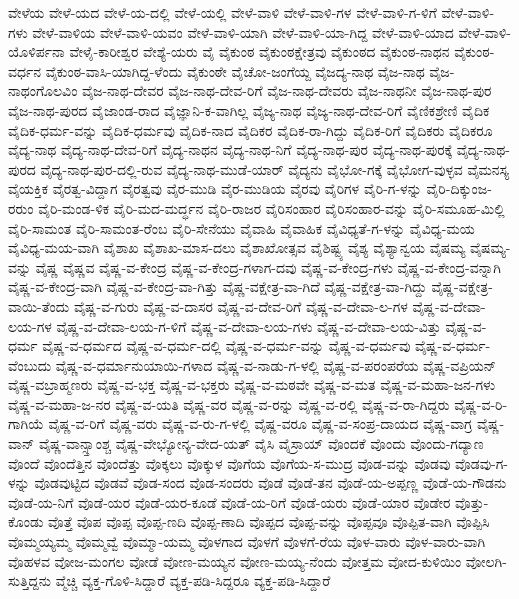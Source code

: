 ವೇಳೆಯ
ವೇಳೆ-ಯದ
ವೇಳೆ-ಯ-ದಲ್ಲಿ
ವೇಳೆ-ಯಲ್ಲಿ
ವೇಳೆ-ವಾಳಿ
ವೇಳೆ-ವಾಳಿ-ಗಳ
ವೇಳೆ-ವಾಳಿ-ಗ-ಳಿಗೆ
ವೇಳೆ-ವಾಳಿ-ಗಳು
ವೇಳೆ-ವಾಳಿಯ
ವೇಳೆ-ವಾಳಿ-ಯವಂ
ವೇಳೆ-ವಾಳಿ-ಯಾಗಿ
ವೇಳೆ-ವಾಳಿ-ಯಾ-ಗಿದ್ದ
ವೇಳೆ-ವಾಳಿ-ಯಾದ
ವೇಳೆ-ವಾಳಿ-ಯೊಳಿರ್ಪನಾ
ವೇಳೈ-ಕಾರೀಶ್ವರ
ವೇಶ್ಯೆ-ಯರು
ವೈ
ವೈಕುಂಠ
ವೈಕುಂಠಕ್ಷೇತ್ರವು
ವೈಕುಂಠದ
ವೈಕುಂಠ-ನಾಥನ
ವೈಕುಂಠ-ವರ್ಧನ
ವೈಕುಂಠ-ವಾಸಿ-ಯಾಗಿದ್ದ-ಳೆಂದು
ವೈಕುಂಠೇ
ವೈಚೋ-ಜಂಗೆಯ್ದ
ವೈಜದ್ಯ-ನಾಥ
ವೈಜ-ನಾಥ
ವೈಜ-ನಾಥಂಗೊಲವಿಂ
ವೈಜ-ನಾಥ-ದೇವರ
ವೈಜ-ನಾಥ-ದೇವ-ರಿಗೆ
ವೈಜ-ನಾಥ-ದೇವರು
ವೈಜ-ನಾಥನೀ
ವೈಜ-ನಾಥ-ಪುರ
ವೈಜ-ನಾಥ-ಪುರದ
ವೈಜಾಂಡ-ರಾದ
ವೈಜ್ಞಾನಿ-ಕ-ವಾಗಿಲ್ಲ
ವೈಜ್ಯ-ನಾಥ
ವೈಜ್ಯ-ನಾಥ-ದೇವ-ರಿಗೆ
ವೈಣಿಕಶ್ರೇಣಿ
ವೈದಿಕ
ವೈದಿಕ-ಧರ್ಮ-ವನ್ನು
ವೈದಿಕ-ಧರ್ಮವು
ವೈದಿಕ-ನಾದ
ವೈದಿಕರ
ವೈದಿಕ-ರಾ-ಗಿದ್ದು
ವೈದಿಕ-ರಿಗೆ
ವೈದಿಕರು
ವೈದಿಕರೂ
ವೈದ್ಯ-ನಾಥ
ವೈದ್ಯ-ನಾಥ-ದೇವ-ರಿಗೆ
ವೈದ್ಯ-ನಾಥನ
ವೈದ್ಯ-ನಾಥ-ನಿಗೆ
ವೈದ್ಯ-ನಾಥ-ಪುರ
ವೈದ್ಯ-ನಾಥ-ಪುರಕ್ಕೆ
ವೈದ್ಯ-ನಾಥ-ಪುರದ
ವೈದ್ಯ-ನಾಥ-ಪುರ-ದಲ್ಲಿ-ರುವ
ವೈದ್ಯ-ನಾಥ-ಮುಡೆ-ಯಾರ್
ವೈದ್ಯನು
ವೈಭೋ-ಗಕ್ಕೆ
ವೈಭೋಗ-ವುಳ್ಳವ
ವೈಮನಸ್ಯ
ವೈಯಕ್ತಿಕ
ವೈರತ್ವ-ವಿದ್ದಾಗ
ವೈರತ್ವವು
ವೈರ-ಮುಡಿ
ವೈರ-ಮುಡಿಯ
ವೈರವು
ವೈರಿಗಳ
ವೈರಿ-ಗ-ಳನ್ನು
ವೈರಿ-ದಿಕ್ಕುಂಜ-ರರುಂ
ವೈರಿ-ಮಂಡ-ಳಿಕ
ವೈರಿ-ಮದ-ಮರ್ದ್ಧನ
ವೈರಿ-ರಾಜರ
ವೈರಿಸಂಹಾರ
ವೈರಿಸಂಹಾರ-ವನ್ನು
ವೈರಿ-ಸಮೂಹ-ಮಿಲ್ಲಿ
ವೈರಿ-ಸಾಮಂತ
ವೈರಿ-ಸಾಮಂತ-ರೆಂಬ
ವೈರಿ-ಸೇನೆಯು
ವೈವಾಹಿ
ವೈವಾಹಿಕ
ವೈವಿಧ್ಯತೆ-ಗ-ಳನ್ನು
ವೈವಿಧ್ಯ-ಮಯ
ವೈವಿಧ್ಯ-ಮಯ-ವಾಗಿ
ವೈಶಾಖ
ವೈಶಾಖ-ಮಾಸ-ದಲು
ವೈಶಾಖೋತ್ಸವ
ವೈಶಿಷ್ಟ್ಯ
ವೈಶ್ಯ
ವೈಶ್ಯಾನ್ವಯ
ವೈಷಮ್ಯ
ವೈಷಮ್ಯ-ವನ್ನು
ವೈಷ್ಣ
ವೈಷ್ಣವ
ವೈಷ್ಣ-ವ-ಕೇಂದ್ರ
ವೈಷ್ಣ-ವ-ಕೇಂದ್ರ-ಗಳಾಗ-ದವು
ವೈಷ್ಣ-ವ-ಕೇಂದ್ರ-ಗಳು
ವೈಷ್ಣ-ವ-ಕೇಂದ್ರ-ವನ್ನಾಗಿ
ವೈಷ್ಣ-ವ-ಕೇಂದ್ರ-ವಾಗಿ
ವೈಷ್ಣ-ವ-ಕೇಂದ್ರ-ವಾ-ಗಿತ್ತು
ವೈಷ್ಣ-ವಕ್ಷೇತ್ರ-ವಾ-ಗಿದೆ
ವೈಷ್ಣ-ವಕ್ಷೇತ್ರ-ವಾ-ಗಿದ್ದು
ವೈಷ್ಣ-ವಕ್ಷೇತ್ರ-ವಾಯಿ-ತೆಂದು
ವೈಷ್ಣ-ವ-ಗುರು
ವೈಷ್ಣ-ವ-ದಾಸರ
ವೈಷ್ಣ-ವ-ದೇವ-ರಿಗೆ
ವೈಷ್ಣ-ವ-ದೇವಾ-ಲ-ಗಳ
ವೈಷ್ಣ-ವ-ದೇವಾ-ಲಯ-ಗಳ
ವೈಷ್ಣ-ವ-ದೇವಾ-ಲಯ-ಗ-ಳಿಗೆ
ವೈಷ್ಣ-ವ-ದೇವಾ-ಲಯ-ಗಳು
ವೈಷ್ಣ-ವ-ದೇವಾ-ಲಯ-ವಿತ್ತು
ವೈಷ್ಣ-ವ-ಧರ್ಮ
ವೈಷ್ಣ-ವ-ಧರ್ಮದ
ವೈಷ್ಣ-ವ-ಧರ್ಮ-ದಲ್ಲಿ
ವೈಷ್ಣ-ವ-ಧರ್ಮ-ವನ್ನು
ವೈಷ್ಣ-ವ-ಧರ್ಮವು
ವೈಷ್ಣ-ವ-ಧರ್ಮ-ವೆಂಬುದು
ವೈಷ್ಣ-ವ-ಧರ್ಮಾನುಯಾಯಿ-ಗಳಾದ
ವೈಷ್ಣ-ವ-ನಾಡು-ಗ-ಳಲ್ಲಿ
ವೈಷ್ಣ-ವ-ಪರಂಪರೆಯ
ವೈಷ್ಣ-ವಪ್ರಿಯನ್
ವೈಷ್ಣ-ವಬ್ರಾಹ್ಮಣರು
ವೈಷ್ಣ-ವ-ಭಕ್ತ
ವೈಷ್ಣ-ವ-ಭಕ್ತರು
ವೈಷ್ಣ-ವ-ಮಠವೇ
ವೈಷ್ಣ-ವ-ಮತ
ವೈಷ್ಣ-ವ-ಮಹಾ-ಜನ-ಗಳು
ವೈಷ್ಣ-ವ-ಮಹಾ-ಜ-ನರ
ವೈಷ್ಣ-ವ-ಯತಿ
ವೈಷ್ಣ-ವರ
ವೈಷ್ಣ-ವ-ರನ್ನು
ವೈಷ್ಣ-ವ-ರಲ್ಲಿ
ವೈಷ್ಣ-ವ-ರಾ-ಗಿದ್ದರು
ವೈಷ್ಣ-ವ-ರಿ-ಗಾಗಿಯೆ
ವೈಷ್ಣ-ವ-ರಿಗೆ
ವೈಷ್ಣ-ವರು
ವೈಷ್ಣ-ವ-ರು-ಗ-ಳಲ್ಲಿ
ವೈಷ್ಣ-ವರೂ
ವೈಷ್ಣ-ವ-ಸಂಪ್ರ-ದಾಯದ
ವೈಷ್ಣ-ವಾಗ್ರ
ವೈಷ್ಣ-ವಾನ್
ವೈಷ್ಣ-ವಾನ್ಸ್ತಾಂಶ್ಚ
ವೈಷ್ಣ-ವೇಭ್ಯೋನ್ಯ-ವೇದ-ಯತ್
ವೈಸಿ
ವೈಸ್ರಾಯ್
ವೊಂದಕೆ
ವೊಂದು
ವೊಂದು-ಗದ್ಯಾಣ
ವೊಂದೆ
ವೊಂದೆತ್ತಿನ
ವೊಂದೆತ್ತು
ವೊಕ್ಕಲು
ವೊಕ್ಕುಳ
ವೊಗೆಯ
ವೊಗೆಯ-ಸ-ಮುದ್ರ
ವೊಡ-ವನ್ನು
ವೊಡವು
ವೊಡವು-ಗ-ಳನ್ನು
ವೊಡವುಟ್ಟಿದ
ವೊಡವೆ
ವೊಡ-ಸಂದ
ವೊಡ-ಸಂದರು
ವೊಡೆ
ವೊಡೆ-ತನ
ವೊಡೆ-ಯ-ಅಪ್ಪಣ್ಣ
ವೊಡೆ-ಯ-ಗೌಡನು
ವೊಡೆ-ಯ-ನಿಗೆ
ವೊಡೆ-ಯರ
ವೊಡೆ-ಯರ-ಕೂಡೆ
ವೊಡೆ-ಯ-ರಿಗೆ
ವೊಡೆ-ಯರು
ವೊಡೆ-ಯಾರ
ವೊಡೇರ
ವೊತ್ತು-ಕೊಂಡು
ವೊತ್ತೆ
ವೊಪ
ವೊಪ್ಪ
ವೊಪ್ಪ-ಣದಿ
ವೊಪ್ಪ-ಣಾದಿ
ವೊಪ್ಪದ
ವೊಪ್ಪ-ವನ್ನು
ವೊಪ್ಪವೂ
ವೊಪ್ಪಿತ-ವಾಗಿ
ವೊಪ್ಪಿಸಿ
ವೊಮ್ಮಯ್ಯಮ್ಮ
ವೊಮ್ಮವ್ವೆ
ವೊಮ್ಮಾ-ಯಮ್ಮ
ವೊಳಗಾದ
ವೊಳಗೆ
ವೊಳಗೆ-ರೆಯ
ವೊಳ-ವಾರು
ವೊಳ-ವಾರು-ವಾಗಿ
ವೊಹಳವ
ವೋಜ-ಮಂಗಲ
ವೋಡೆ
ವೋಣ-ಮಯ್ಯನ
ವೋಣ-ಮಯ್ಯ-ನೆಂದು
ವೋತ್ತಮ
ವೋದ-ಕುಳಿಯಿಂ
ವೋಲಗಿ-ಸುತ್ತಿದ್ದನು
ವ್ಮೆಚ್ಚಿ
ವ್ಯಕ್ತ-ಗೊಳಿ-ಸಿದ್ದಾರೆ
ವ್ಯಕ್ತ-ಪಡಿ-ಸಿದ್ದರೂ
ವ್ಯಕ್ತ-ಪಡಿ-ಸಿದ್ದಾರೆ
